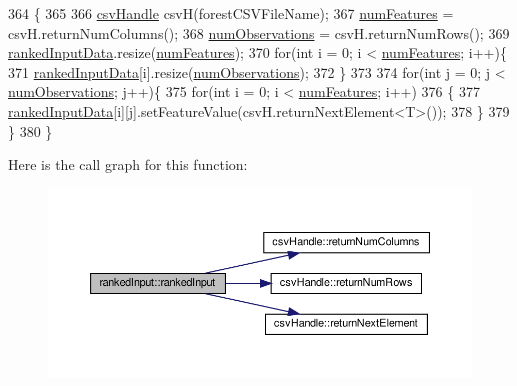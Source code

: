 \begin{DoxyCode}
364                                                         \{
365 
366             \hyperlink{classcsvHandle}{csvHandle} csvH(forestCSVFileName);
367             \hyperlink{classrankedInput_ad86e2ad8f4044697450ddfdb15aa10a9}{numFeatures} = csvH.returnNumColumns();
368             \hyperlink{classrankedInput_a7b0e6ebcf6fa2fcd0b08918e3b3020be}{numObservations} = csvH.returnNumRows();
369             \hyperlink{classrankedInput_a5450364c3f258e15f28248a8a3c93ffa}{rankedInputData}.resize(\hyperlink{classrankedInput_ad86e2ad8f4044697450ddfdb15aa10a9}{numFeatures});
370             \textcolor{keywordflow}{for}(\textcolor{keywordtype}{int} i = 0; i < \hyperlink{classrankedInput_ad86e2ad8f4044697450ddfdb15aa10a9}{numFeatures}; i++)\{
371                 \hyperlink{classrankedInput_a5450364c3f258e15f28248a8a3c93ffa}{rankedInputData}[i].resize(\hyperlink{classrankedInput_a7b0e6ebcf6fa2fcd0b08918e3b3020be}{numObservations});
372             \}
373 
374             \textcolor{keywordflow}{for}(\textcolor{keywordtype}{int} j = 0; j < \hyperlink{classrankedInput_a7b0e6ebcf6fa2fcd0b08918e3b3020be}{numObservations}; j++)\{
375                 \textcolor{keywordflow}{for}(\textcolor{keywordtype}{int} i = 0; i < \hyperlink{classrankedInput_ad86e2ad8f4044697450ddfdb15aa10a9}{numFeatures}; i++)
376                 \{
377                     \hyperlink{classrankedInput_a5450364c3f258e15f28248a8a3c93ffa}{rankedInputData}[i][j].setFeatureValue(csvH.returnNextElement<T>());  
378                 \}
379             \}
380         \}
\end{DoxyCode}
Here is the call graph for this function\+:\nopagebreak
\begin{figure}[H]
\begin{center}
\leavevmode
\includegraphics[width=350pt]{classrankedInput_a5b881de847a501b5c6857f6f3ade26a2_cgraph}
\end{center}
\end{figure}


